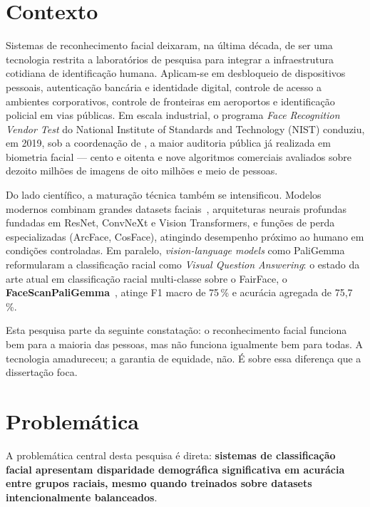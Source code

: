 
\section{Contexto}
\label{sec:contexto}

Sistemas de reconhecimento facial deixaram, na última década, de ser uma tecnologia restrita a laboratórios de pesquisa para integrar a infraestrutura cotidiana de identificação humana. Aplicam-se em desbloqueio de dispositivos pessoais, autenticação bancária e identidade digital, controle de acesso a ambientes corporativos, controle de fronteiras em aeroportos e identificação policial em vias públicas. Em escala industrial, o programa \emph{Face Recognition Vendor Test} do National Institute of Standards and Technology (NIST) conduziu, em 2019, sob a coordenação de , a maior auditoria pública já realizada em biometria facial --- cento e oitenta e nove algoritmos comerciais avaliados sobre dezoito milhões de imagens de oito milhões e meio de pessoas.

Do lado científico, a maturação técnica também se intensificou. Modelos modernos combinam grandes datasets faciais~\cite{karkkainen2021fairface,wang2019racial,robinson2020face}, arquiteturas neurais profundas fundadas em ResNet, ConvNeXt e Vision Transformers, e funções de perda especializadas (ArcFace, CosFace), atingindo desempenho próximo ao humano em condições controladas. Em paralelo, \emph{vision-language models} como PaliGemma reformularam a classificação racial como \emph{Visual Question Answering}: o estado da arte atual em classificação racial multi-classe sobre o FairFace, o \textbf{FaceScanPaliGemma}~\cite{aldahoul2024exploring}, atinge F1 macro de 75\,\% e acurácia agregada de 75,7\,\%.

Esta pesquisa parte da seguinte constatação: o reconhecimento facial funciona bem para a maioria das pessoas, mas não funciona igualmente bem para todas. A tecnologia amadureceu; a garantia de equidade, não. É sobre essa diferença que a dissertação foca.


\section{Problemática}
\label{sec:problema}

A problemática central desta pesquisa é direta: \textbf{sistemas de classificação facial apresentam disparidade demográfica significativa em acurácia entre grupos raciais, mesmo quando treinados sobre datasets intencionalmente balanceados}.

